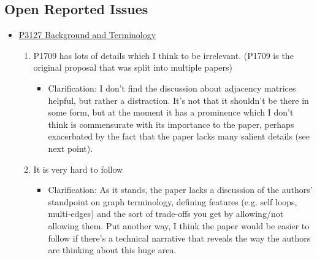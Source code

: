 \subsection{Open Reported Issues}
\begin{itemize}
      \item \href{https://www.wg21.link/P3127}{P3127 Background and Terminology}
            \begin{enumerate}
                  \item P1709 has lots of details which I think to be irrelevant. (P1709 is the original proposal that was split into multiple papers)
                        \begin{itemize}
                              \item Clarification: I don't find the discussion about adjacency matrices helpful, but rather a distraction. 
                                    It's not that it shouldn't be there in some form, but at the moment it has a prominence which I don't think is 
                                    commensurate with its importance to the paper, perhaps exacerbated by the fact that the paper lacks many salient details (see next point).
                        \end{itemize}
                  \item It is very hard to follow
                        \begin{itemize}
                              \item Clarification: As it stands, the paper lacks a discussion of the authors' standpoint on graph terminology, defining features 
                                    (e.g. self loops, multi-edges) and the sort of trade-offs you get by allowing/not allowing them. Put another way, I think the 
                                    paper would be easier to follow if there's a technical narrative that reveals the way the authors are thinking about this huge area. 


\end{itemize}
\end{enumerate}
\end{itemize}
